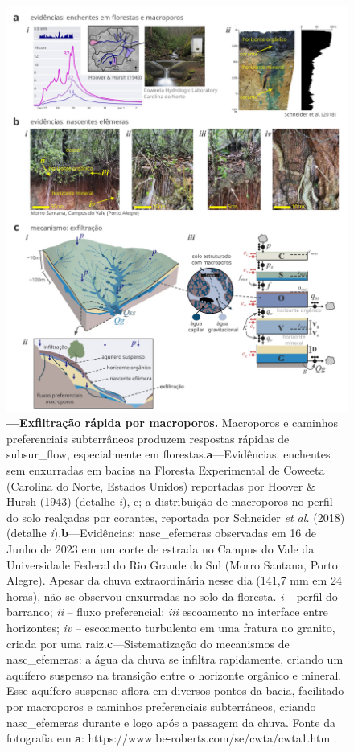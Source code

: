 \documentclass[./main.tex]{subfiles}
\begin{document}
\begin{figure}[t!] 
\centering				
\includegraphics[width=0.98\linewidth]{figs/fig_macropores.jpg}		
\caption[Exfiltração rápida por macroporos]
{\textbf{---\;Exfiltração rápida por macroporos.}
    Macroporos e caminhos preferenciais subterrâneos produzem respostas rápidas de \gls{subsur_flow}, especialmente em florestas.\;\textbf{a}\;---\;Evidências: enchentes sem enxurradas em bacias na Floresta Experimental de Coweeta (Carolina do Norte, Estados Unidos) reportadas por Hoover \& Hursh (1943) \cite{Hoover1943} (detalhe \textrm{\textit{i}}), e; a distribuição de macroporos no perfil do solo realçadas por corantes, reportada por Schneider \textit{et al.} (2018) \cite{Schneider2018} (detalhe \textrm{\textit{i}}).\;\textbf{b}\;---\;Evidências: \gls{nasc_efemeras} observadas em 16 de Junho de 2023 em um corte de estrada no Campus do Vale da Universidade Federal do Rio Grande do Sul (Morro Santana, Porto Alegre). Apesar da chuva extraordinária nesse dia (141,7 mm em 24 horas), não se observou enxurradas no solo da floresta. \textrm{\textit{i}} -- perfil do barranco; \textrm{\textit{ii}} -- fluxo preferencial; \textrm{\textit{iii}} escoamento na interface entre horizontes; \textrm{\textit{iv}} -- escoamento turbulento em uma fratura no granito, criada por uma raiz.\;\textbf{c}\;---\;Sistematização do mecanismos de \gls{nasc_efemeras}: a água da chuva se infiltra rapidamente, criando um aquífero suspenso na transição entre o horizonte orgânico e mineral. Esse aquífero suspenso aflora em diversos pontos da bacia, facilitado por macroporos e caminhos preferenciais subterrâneos, criando \gls{nasc_efemeras} durante e logo após a passagem da chuva. Fonte da fotografia em \textbf{a}: https://www.be-roberts.com/se/cwta/cwta1.htm .
}
\label{fig:hydro:macro} 		
\end{figure}
\end{document}
